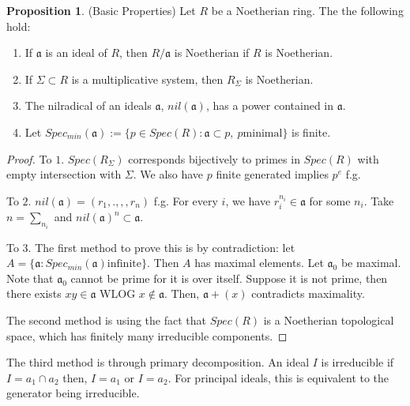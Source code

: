 \documentclass{article}
\theoremstyle{definition}
\theoremstyle{definition}
\theoremstyle{definition}
\newtheorem{proposition}{Proposition}[section]
\theoremstyle{definition}
\theoremstyle{definition}
\theoremstyle{definition}
\theoremstyle{definition}
\begin{document}
\begin{tcolorbox}[colback=blue!5!white,colframe=blue!30!white]
\begin{proposition}
(Basic Properties) Let $R$ be a Noetherian ring. The the following hold: 
\begin{enumerate}
    \item If $\mathfrak{a}$ is an ideal of $R$, then $R/\mathfrak{a}$ is Noetherian if $R$ is Noetherian.
    \item If $\Sigma\subset R$ is a multiplicative system, then $R_{\Sigma}$ is Noetherian. 
    \item The nilradical of an ideals $\mathfrak{a}$, $nil(\mathfrak{a})$, has a power contained in $\mathfrak{a}$.
    \item  Let $Spec_{min}(\mathfrak{a}):=\{ p\in Spec(R): \mathfrak{a}\subset p, \ p \textrm{minimal}  \}$ is finite.
\end{enumerate}
\end{proposition}
\end{tcolorbox}
\begin{proof}
    To $1$. $Spec(R_{\Sigma})$ corresponds bijectively to primes in $Spec(R)$ with empty intersection with $\Sigma$. We also have $p$ finite generated implies $p^e$ f.g.

    To $2$. $nil(\mathfrak{a})=(r_1,.,,,r_n)$ f.g. For every $i$, we have $r_i^{n_i}\in \mathfrak{a}$ for some $n_i$. Take $n=\sum_{n_i}$ and $nil(\mathfrak{a})^{n}\subset \mathfrak{a}$. 
    
    To $3$. The first method to prove this is by contradiction: let $A=\{ \mathfrak{a}: Spec_{min}(\mathfrak{a}) \textrm{infinite} \}$. Then $A$ has maximal elements. Let $\mathfrak{a_0}$ be maximal. Note that $\mathfrak{a_0}$ cannot be prime for it is over itself. Suppose it is not prime, then there exists $xy\in \mathfrak{a}$ WLOG $x\not \in \mathfrak{a}$. Then, $\mathfrak{a}+(x)$ contradicts maximality.

    The second method is using the fact that $Spec(R)$ is a Noetherian topological space, which has finitely many irreducible components.

\end{proof}
The third method is through primary decomposition. An ideal $I$ is irreducible if $I=a_1\cap a_2$ then, $I=a_1$ or $I=a_2$. For principal ideals, this is equivalent to the generator being irreducible. 
\end{document}
